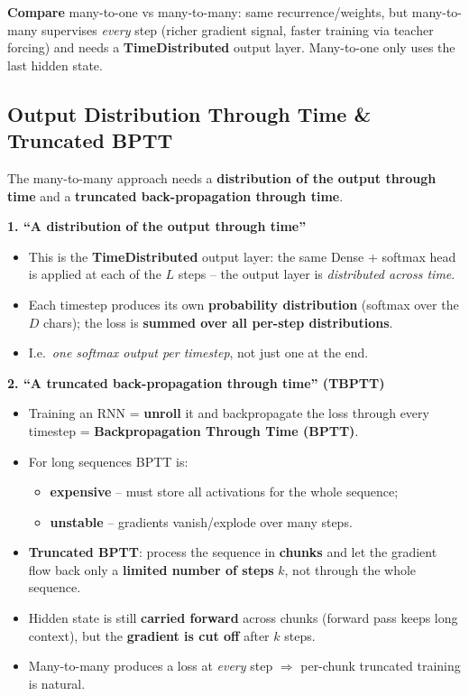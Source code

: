 \documentclass[10pt,a4paper]{article}
\begin{document}
	\begin{examtipbox}
		\textbf{Compare} many-to-one vs many-to-many: same recurrence/weights, but many-to-many supervises \emph{every} step (richer gradient signal, faster training via teacher forcing) and needs a \textbf{TimeDistributed} output layer. Many-to-one only uses the last hidden state.
	\end{examtipbox}

	\subsection{Output Distribution Through Time \& Truncated BPTT}

	\begin{definitionbox}
		The many-to-many approach needs a \textbf{distribution of the output through time} and a \textbf{truncated back-propagation through time}.
	\end{definitionbox}

	\textbf{1. ``A distribution of the output through time''}
	\begin{itemize}[leftmargin=*]
		\item This is the \textbf{TimeDistributed} output layer: the same Dense + softmax head is applied at each of the $L$ steps -- the output layer is \emph{distributed across time}.
		\item Each timestep produces its own \textbf{probability distribution} (softmax over the $D$ chars); the loss is \textbf{summed over all per-step distributions}.
		\item I.e.\ \emph{one softmax output per timestep}, not just one at the end.
	\end{itemize}

	\textbf{2. ``A truncated back-propagation through time'' (TBPTT)}
	\begin{itemize}[leftmargin=*]
		\item Training an RNN = \textbf{unroll} it and backpropagate the loss through every timestep = \textbf{Backpropagation Through Time (BPTT)}.
		\item For long sequences BPTT is:
		\begin{itemize}[leftmargin=*]
			\item \textbf{expensive} -- must store all activations for the whole sequence;
			\item \textbf{unstable} -- gradients vanish/explode over many steps.
		\end{itemize}
		\item \textbf{Truncated BPTT}: process the sequence in \textbf{chunks} and let the gradient flow back only a \textbf{limited number of steps} $k$, not through the whole sequence.
		\item Hidden state is still \textbf{carried forward} across chunks (forward pass keeps long context), but the \textbf{gradient is cut off} after $k$ steps.
		\item Many-to-many produces a loss at \emph{every} step $\Rightarrow$ per-chunk truncated training is natural.
	\end{itemize}
\end{document}
